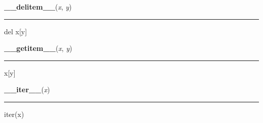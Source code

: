     \label{pygame:PixelArray:__delitem__}

    \vspace{0.5ex}

\hspace{.8\funcindent}\begin{boxedminipage}{\funcwidth}

    \raggedright \textbf{\_\_delitem\_\_}(\textit{x}, \textit{y})

    \vspace{-1.5ex}

    \rule{\textwidth}{0.5\fboxrule}
\setlength{\parskip}{2ex}
    del x[y]

\setlength{\parskip}{1ex}
    \end{boxedminipage}

    \label{pygame:PixelArray:__getitem__}

    \vspace{0.5ex}

\hspace{.8\funcindent}\begin{boxedminipage}{\funcwidth}

    \raggedright \textbf{\_\_getitem\_\_}(\textit{x}, \textit{y})

    \vspace{-1.5ex}

    \rule{\textwidth}{0.5\fboxrule}
\setlength{\parskip}{2ex}
    x[y]

\setlength{\parskip}{1ex}
    \end{boxedminipage}

    \label{pygame:PixelArray:__iter__}

    \vspace{0.5ex}

\hspace{.8\funcindent}\begin{boxedminipage}{\funcwidth}

    \raggedright \textbf{\_\_iter\_\_}(\textit{x})

    \vspace{-1.5ex}

    \rule{\textwidth}{0.5\fboxrule}
\setlength{\parskip}{2ex}
    iter(x)

\setlength{\parskip}{1ex}
    \end{boxedminipage}

